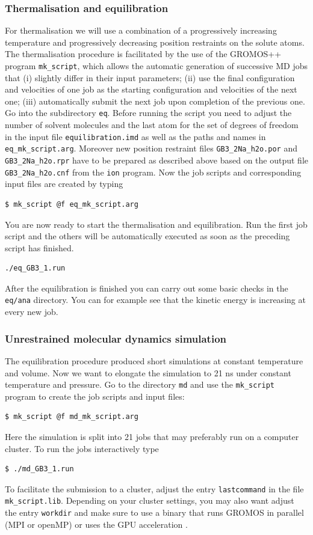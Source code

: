 \subsubsection{Thermalisation and equilibration}
For thermalisation we will use a combination of a progressively increasing temperature and progressively decreasing position restraints on the solute atoms. The thermalisation procedure is facilitated by the use of the GROMOS++ program \texttt{mk\_script}, which allows the automatic generation of successive MD jobs that (i) slightly differ in their input parameters; (ii) use the final configuration and velocities of one job as the starting configuration and velocities of the next one; (iii) automatically submit the next job upon completion of the previous one. Go into the subdirectory \texttt{eq}. Before running the script you need to adjust the number of solvent molecules and the last atom for the set of degrees of freedom in the input file \texttt{equilibration.imd} as well as the paths and names in \texttt{eq\_mk\_script.arg}. Moreover new position restraint files \texttt{GB3\_2Na\_h2o.por} and \texttt{GB3\_2Na\_h2o.rpr} have to be prepared as described above based on the output file \texttt{GB3\_2Na\_h2o.cnf} from the \texttt{ion} program. Now the job scripts and corresponding input files are created by typing
\begin{lstlisting}
$ mk_script @f eq_mk_script.arg
\end{lstlisting}
You are now ready to start the thermalisation and equilibration. Run the first job script and the others will be automatically executed as soon as the preceding script has finished.
\begin{lstlisting}
./eq_GB3_1.run
\end{lstlisting}
After the equilibration is finished you can carry out some basic checks in the \texttt{eq/ana} directory. You can for example see that the kinetic energy is increasing at every new job.

\subsubsection{Unrestrained molecular dynamics simulation}
The equilibration procedure produced short simulations at constant temperature and volume. Now we want to elongate the simulation to 21 ns under constant temperature and pressure. Go to the directory \texttt{md} and use the \texttt{mk\_script} program to create the job scripts and input files:
\begin{lstlisting}
$ mk_script @f md_mk_script.arg
\end{lstlisting}
Here the simulation is split into 21 jobs that may preferably run on a computer cluster. To run the jobs interactively type
\begin{lstlisting}
$ ./md_GB3_1.run
\end{lstlisting}
To facilitate the submission to a cluster, adjust the entry \texttt{lastcommand} in the file \texttt{mk\_script.lib}. Depending on your cluster settings, you may also want adjust the entry \texttt{workdir} and 
make sure to use a binary that runs GROMOS in parallel (MPI or openMP) or uses the GPU acceleration \cite{volume_8}.

